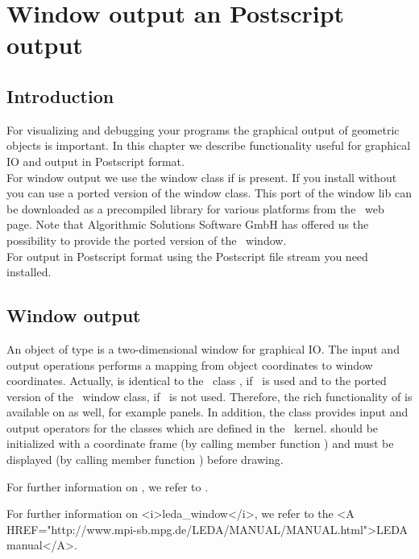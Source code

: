 \ccParDims

\chapter{Window output an Postscript output}
\label{chapterWin}

\section{Introduction}

For visualizing and debugging your programs the graphical output of geometric objects is
important. In this chapter we describe functionality useful for graphical IO and output
in Postscript format.\\
For window output we use the \leda window class if \leda is present. If you install
\cgal without \leda you can use a ported version of the \leda window class.
This port of the \leda window lib can be downloaded as a precompiled library for various 
platforms from the \cgal\ web page. Note that Algorithmic Solutions Software GmbH 
has offered us the possibility to provide the ported version of the \leda\ 
window.\\
For output in Postscript format using the \cgal Postscript file stream you need 
\leda installed.

\section{Window output}

An object of type  is a two-dimensional window for
graphical IO. The input and output operations performs a mapping from
object coordinates to window coordinates.
Actually,  is identical to the \leda\ class ,
if \leda\ is used and to the ported version of the \leda\ window class, if
\leda\ is not used.
Therefore, the rich functionality of  is available on
 as well, for example panels.
In addition, the class  provides input and output 
operators for the classes which are defined in the \cgal\ kernel.
\ccStyle{CGAL::Window_stream} should be initialized with a coordinate frame 
(by calling member function
) and must be displayed (by calling member function ) before
drawing.

\begin{ccTexOnly}
For further information on , we refer to \cite{mnsu-lum}.
\end{ccTexOnly}
\begin{ccHtmlOnly}
For further information on <i>leda_window</i>, we refer to the 
<A HREF="http://www.mpi-sb.mpg.de/LEDA/MANUAL/MANUAL.html">LEDA manual</A>.
\end{ccHtmlOnly}

